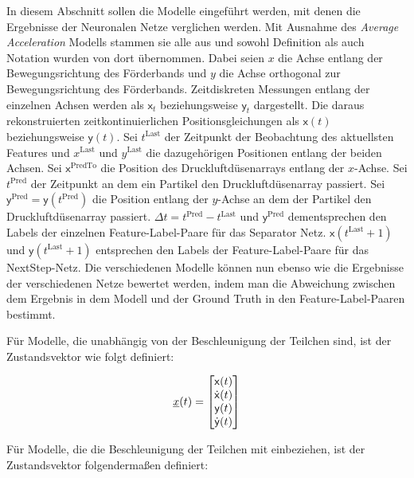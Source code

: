 In diesem Abschnitt sollen die Modelle eingeführt werden, mit denen die Ergebnisse der Neuronalen Netze verglichen werden.
Mit Ausnahme des \textit{Average Acceleration} Modells stammen sie alle aus \cite{Pfaff2018} und sowohl Definition als auch Notation wurden von dort übernommen.
Dabei seien \(x\) die Achse entlang der Bewegungsrichtung des Förderbands und \(y\) die Achse orthogonal zur Bewegungsrichtung des Förderbands.
Zeitdiskreten Messungen entlang der einzelnen Achsen werden als \(\mathsf{x}_t\) beziehungsweise \(\mathsf{y}_t\) dargestellt.
Die daraus rekonstruierten zeitkontinuierlichen Positionsgleichungen als \(\mathsf{x}(t)\) beziehungsweise \(\mathsf{y}(t)\).
Sei \(t^{\text{Last}}\) der Zeitpunkt der Beobachtung des aktuellsten Features und \(x^{\text{Last}}\) und \(y^{\text{Last}}\) die dazugehörigen Positionen entlang der beiden Achsen.
Sei \(\mathsf{x}^{\text{PredTo}}\) die Position des Druckluftdüsenarrays entlang der \(x\)-Achse.
Sei \(t^{\text{Pred}}\) der Zeitpunkt an dem ein Partikel den Druckluftdüsenarray passiert.
Sei \(\mathsf{y}^{\text{Pred}} = \mathsf{y}(t^{\text{Pred}})\) die Position entlang der \(y\)-Achse an dem der Partikel den Druckluftdüsenarray passiert.
\(\Delta t = t^{\text{Pred}} - t^{\text{Last}} \) und \(\mathsf{y}^{\text{Pred}}\) dementsprechen den Labels der einzelnen Feature-Label-Paare für das Separator Netz.
\(\mathsf{x}(t^{\text{Last}} + 1)\) und \(\mathsf{y}(t^{\text{Last}} + 1)\) entsprechen den Labels der Feature-Label-Paare für das NextStep-Netz.
Die verschiedenen Modelle können nun ebenso wie die Ergebnisse der verschiedenen Netze bewertet werden, 
indem man die Abweichung zwischen dem Ergebnis in dem Modell und der Ground Truth in den Feature-Label-Paaren bestimmt.


Für Modelle, die unabhängig von der Beschleunigung der Teilchen sind, ist der Zustandsvektor wie folgt definiert:

\begin{equation} \label{eq:definitionCV}
    {\underline{x}}(t) = 
    \begin{bmatrix}
        \mathsf{x}(t) \\
        \dot{\mathsf{x}}(t) \\
        \mathsf{y}(t) \\
        \dot{\mathsf{y}}(t)
       \end{bmatrix} 
\end{equation}

Für Modelle, die die Beschleunigung der Teilchen mit einbeziehen, ist der Zustandsvektor folgendermaßen definiert:

